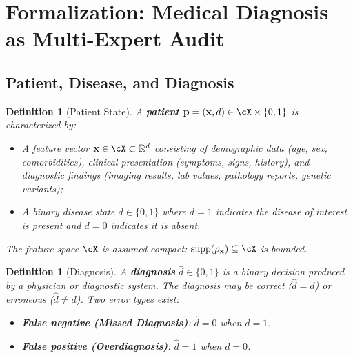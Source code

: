 \documentclass[11pt,a4paper]{article}
\newtheorem{definition}[theorem]{Definition}
\theoremstyle{definition}
\DeclareMathOperator{\supp}{supp}
\newcommand{\R}{\mathbb{R}}
\newcommand{\patient}{\mathbf{p}}              %
\newcommand{\disease}{d}                       %
\newcommand{\diagnosis}{\hat{d}}               %
\begin{document}
\section{Formalization: Medical Diagnosis as Multi-Expert Audit}
\label{sec:formalism}

\subsection{Patient, Disease, and Diagnosis}

\begin{definition}[Patient State]
\label{def:patient}
A \textbf{patient} $\patient = (\mathbf{x}, \disease) \in \cX \times \{0,1\}$
is characterized by:
\begin{itemize}[nosep]
    \item A feature vector $\mathbf{x} \in \cX \subset \R^d$ consisting of
    demographic data (age, sex, comorbidities), clinical presentation (symptoms,
    signs, history), and diagnostic findings (imaging results, lab values,
    pathology reports, genetic variants);
    \item A binary disease state $\disease \in \{0,1\}$ where $\disease = 1$ indicates
    the disease of interest is present and $\disease = 0$ indicates it is absent.
\end{itemize}
The feature space $\cX$ is assumed compact: $\supp(\rho_{\mathbf{x}}) \subseteq \cX$
is bounded.
\end{definition}

\begin{definition}[Diagnosis]
\label{def:diagnosis}
A \textbf{diagnosis} $\diagnosis \in \{0,1\}$ is a binary decision produced by
a physician or diagnostic system. The diagnosis may be correct ($\diagnosis = \disease$)
or erroneous ($\diagnosis \neq \disease$). Two error types exist:
\begin{itemize}[nosep]
    \item \textbf{False negative (Missed Diagnosis)}: $\diagnosis = 0$ when $\disease = 1$.
    \item \textbf{False positive (Overdiagnosis)}: $\diagnosis = 1$ when $\disease = 0$.
\end{itemize}
\end{definition}
\end{document}
